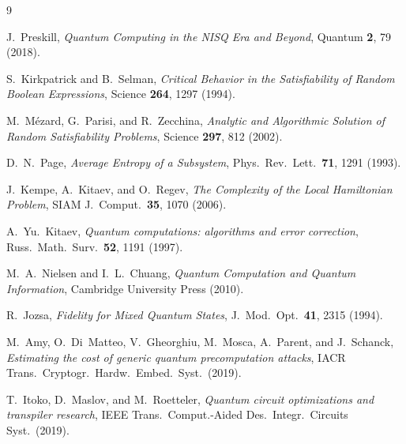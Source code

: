 \documentclass[aps,preprint,secnum,lined]{revtex4-2}
\begin{document}
\begin{thebibliography}{9}

J.~Preskill,
\emph{Quantum Computing in the NISQ Era and Beyond},
Quantum \textbf{2}, 79 (2018).

S.~Kirkpatrick and B.~Selman,
\emph{Critical Behavior in the Satisfiability of Random Boolean Expressions},
Science \textbf{264}, 1297 (1994).

M.~M{\'e}zard, G.~Parisi, and R.~Zecchina,
\emph{Analytic and Algorithmic Solution of Random Satisfiability Problems},
Science \textbf{297}, 812 (2002).

D.~N.~Page,
\emph{Average Entropy of a Subsystem},
Phys.\ Rev.\ Lett.\ \textbf{71}, 1291 (1993).

J.~Kempe, A.~Kitaev, and O.~Regev,
\emph{The Complexity of the Local Hamiltonian Problem},
SIAM J.\ Comput.\ \textbf{35}, 1070 (2006).

A.~Yu.~Kitaev,
\emph{Quantum computations: algorithms and error correction},
Russ.\ Math.\ Surv.\ \textbf{52}, 1191 (1997).

M.~A.~Nielsen and I.~L.~Chuang,
\emph{Quantum Computation and Quantum Information},
Cambridge University Press (2010).

R.~Jozsa,
\emph{Fidelity for Mixed Quantum States},
J.\ Mod.\ Opt.\ \textbf{41}, 2315 (1994).

M.~Amy, O.~Di~Matteo, V.~Gheorghiu, M.~Mosca, A.~Parent, and J.~Schanck,
\emph{Estimating the cost of generic quantum precomputation attacks},
IACR Trans.\ Cryptogr.\ Hardw.\ Embed.\ Syst.\ (2019).

T.~Itoko, D.~Maslov, and M.~Roetteler,
\emph{Quantum circuit optimizations and transpiler research},
IEEE Trans.\ Comput.-Aided Des.\ Integr.\ Circuits Syst.\ (2019).

\end{thebibliography}
\end{document}

